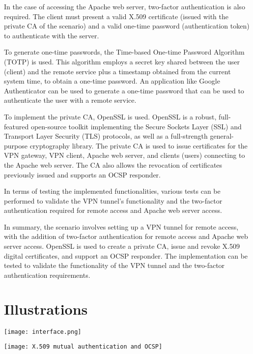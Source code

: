 \documentclass[12pt]{article}
\begin{document}
In the case of accessing the Apache web server, two-factor authentication is also required. The client must present a valid X.509 certificate (issued with the private CA of the scenario) and a valid one-time password (authentication token) to authenticate with the server.

To generate one-time passwords, the Time-based One-time Password Algorithm (TOTP) is used. This algorithm employs a secret key shared between the user (client) and the remote service plus a timestamp obtained from the current system time, to obtain a one-time password. An application like Google Authenticator can be used to generate a one-time password that can be used to authenticate the user with a remote service.

To implement the private CA, OpenSSL is used. OpenSSL is a robust, full-featured open-source toolkit implementing the Secure Sockets Layer (SSL) and Transport Layer Security (TLS) protocols, as well as a full-strength general-purpose cryptography library. The private CA is used to issue certificates for the VPN gateway, VPN client, Apache web server, and clients (users) connecting to the Apache web server. The CA also allows the revocation of certificates previously issued and supports an OCSP responder.

In terms of testing the implemented functionalities, various tests can be performed to validate the VPN tunnel's functionality and the two-factor authentication required for remote access and Apache web server access.

\newpage

In summary, the scenario involves setting up a VPN tunnel for remote access, with the addition of two-factor authentication for remote access and Apache web server access. OpenSSL is used to create a private CA, issue and revoke X.509 digital certificates, and support an OCSP responder. The implementation can be tested to validate the functionality of the VPN tunnel and the two-factor authentication requirements.


\newpage

\section{Illustrations}


\begin{center}
\texttt{[image: interface.png]}
\end{center}

\begin{center}
\texttt{[image: X.509 mutual authentication and OCSP]}
\end{center}
\end{document}
